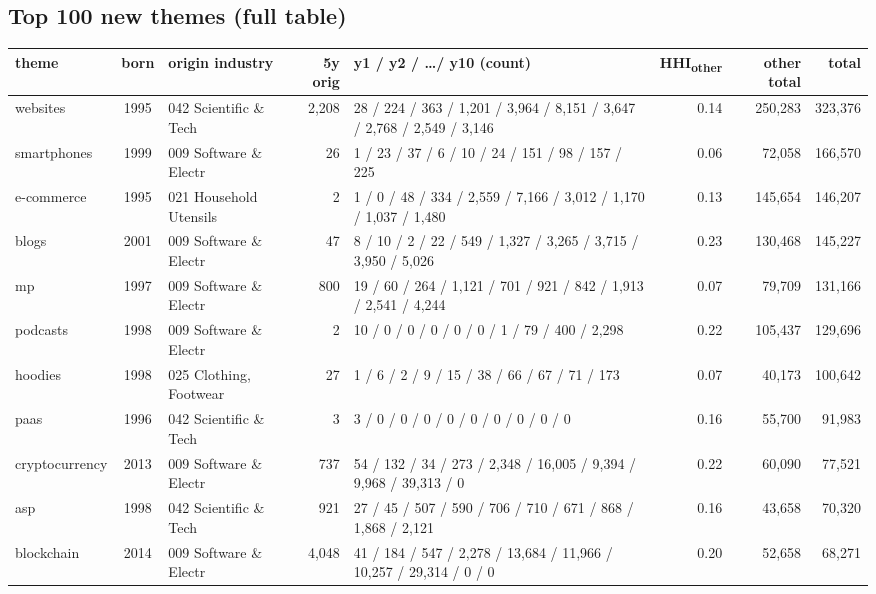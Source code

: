 \documentclass[11pt]{article}
\begin{document}
\clearpage
\begin{landscape}
\section*{Top 100 new themes (full table)}
{\scriptsize
\setlength{\tabcolsep}{4pt}
\begin{longtable}{@{}l c p{2.6cm} r p{6.2cm} r r r@{}}
\toprule
theme & born & origin industry & 5y orig & y1 / y2 / \dots / y10 (count) & HHI\textsubscript{other} & other total & total \\
\midrule
\endhead
websites & 1995 & 042 Scientific \& Tech & 2,208 & \scriptsize{28 / 224 / 363 / 1,201 / 3,964 / 8,151 / 3,647 / 2,768 / 2,549 / 3,146} & 0.14 & 250,283 & 323,376 \\
smartphones & 1999 & 009 Software \& Electr & 26 & \scriptsize{1 / 23 / 37 / 6 / 10 / 24 / 151 / 98 / 157 / 225} & 0.06 & 72,058 & 166,570 \\
e-commerce & 1995 & 021 Household Utensils & 2 & \scriptsize{1 / 0 / 48 / 334 / 2,559 / 7,166 / 3,012 / 1,170 / 1,037 / 1,480} & 0.13 & 145,654 & 146,207 \\
blogs & 2001 & 009 Software \& Electr & 47 & \scriptsize{8 / 10 / 2 / 22 / 549 / 1,327 / 3,265 / 3,715 / 3,950 / 5,026} & 0.23 & 130,468 & 145,227 \\
mp & 1997 & 009 Software \& Electr & 800 & \scriptsize{19 / 60 / 264 / 1,121 / 701 / 921 / 842 / 1,913 / 2,541 / 4,244} & 0.07 & 79,709 & 131,166 \\
podcasts & 1998 & 009 Software \& Electr & 2 & \scriptsize{10 / 0 / 0 / 0 / 0 / 0 / 1 / 79 / 400 / 2,298} & 0.22 & 105,437 & 129,696 \\
hoodies & 1998 & 025 Clothing, Footwear & 27 & \scriptsize{1 / 6 / 2 / 9 / 15 / 38 / 66 / 67 / 71 / 173} & 0.07 & 40,173 & 100,642 \\
paas & 1996 & 042 Scientific \& Tech & 3 & \scriptsize{3 / 0 / 0 / 0 / 0 / 0 / 0 / 0 / 0 / 0} & 0.16 & 55,700 & 91,983 \\
cryptocurrency & 2013 & 009 Software \& Electr & 737 & \scriptsize{54 / 132 / 34 / 273 / 2,348 / 16,005 / 9,394 / 9,968 / 39,313 / 0} & 0.22 & 60,090 & 77,521 \\
asp & 1998 & 042 Scientific \& Tech & 921 & \scriptsize{27 / 45 / 507 / 590 / 706 / 710 / 671 / 868 / 1,868 / 2,121} & 0.16 & 43,658 & 70,320 \\
blockchain & 2014 & 009 Software \& Electr & 4,048 & \scriptsize{41 / 184 / 547 / 2,278 / 13,684 / 11,966 / 10,257 / 29,314 / 0 / 0} & 0.20 & 52,658 & 68,271 \\

\end{longtable}}
\end{landscape}
\end{document}
